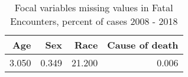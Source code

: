 \begin{table}[ht]
\centering
\begin{tabular}{rrrr}
  \hline
Age & Sex & Race & Cause of death \\ 
  \hline
3.050 & 0.349 & 21.200 & 0.006 \\ 
   \hline
\end{tabular}
\caption{Focal variables missing values in Fatal Encounters, percent of cases 2008 - 2018} 
\label{tab:pct_var}
\end{table}
